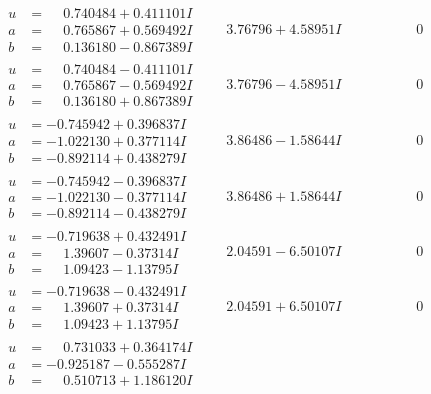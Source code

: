 \documentclass[1p]{elsarticle_modified}
\theoremstyle{definition}
\begin{document}
$$\begin{array}{c|c|c}
\begin{aligned}
u &= \phantom{-}0.740484 + 0.411101 I \\
a &= \phantom{-}0.765867 + 0.569492 I \\
b &= \phantom{-}0.136180 - 0.867389 I\end{aligned}
 & \phantom{-}3.76796 + 4.58951 I & \phantom{-0.000000 } 0 \\ \hline\begin{aligned}
u &= \phantom{-}0.740484 - 0.411101 I \\
a &= \phantom{-}0.765867 - 0.569492 I \\
b &= \phantom{-}0.136180 + 0.867389 I\end{aligned}
 & \phantom{-}3.76796 - 4.58951 I & \phantom{-0.000000 } 0 \\ \hline\begin{aligned}
u &= -0.745942 + 0.396837 I \\
a &= -1.022130 + 0.377114 I \\
b &= -0.892114 + 0.438279 I\end{aligned}
 & \phantom{-}3.86486 - 1.58644 I & \phantom{-0.000000 } 0 \\ \hline\begin{aligned}
u &= -0.745942 - 0.396837 I \\
a &= -1.022130 - 0.377114 I \\
b &= -0.892114 - 0.438279 I\end{aligned}
 & \phantom{-}3.86486 + 1.58644 I & \phantom{-0.000000 } 0 \\ \hline\begin{aligned}
u &= -0.719638 + 0.432491 I \\
a &= \phantom{-}1.39607 - 0.37314 I \\
b &= \phantom{-}1.09423 - 1.13795 I\end{aligned}
 & \phantom{-}2.04591 - 6.50107 I & \phantom{-0.000000 } 0 \\ \hline\begin{aligned}
u &= -0.719638 - 0.432491 I \\
a &= \phantom{-}1.39607 + 0.37314 I \\
b &= \phantom{-}1.09423 + 1.13795 I\end{aligned}
 & \phantom{-}2.04591 + 6.50107 I & \phantom{-0.000000 } 0 \\ \hline\begin{aligned}
u &= \phantom{-}0.731033 + 0.364174 I \\
a &= -0.925187 - 0.555287 I \\
b &= \phantom{-}0.510713 + 1.186120 I\end{aligned}

\end{array}$$
\end{document}
